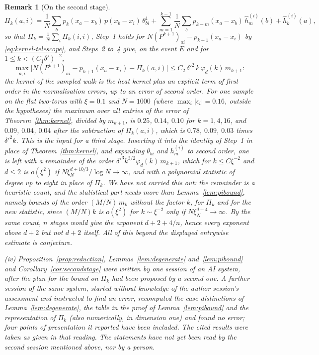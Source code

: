 \documentclass[11pt,a4paper]{article}
\theoremstyle{stmt}
\theoremstyle{defn}
\theoremstyle{rmk}
\newtheorem{remark}[theorem]{Remark}
\numberwithin{equation}{section}
\begin{document}
{\begin{remark}[On the second stage]
\[
\Pi_k(a,i)=\frac1N\sum_bp_k(x_a-x_b)\,p(x_b-x_i)\,\theta^1_{bi}+\sum_{m=1}^{k-1}\frac1N\sum_bp_{k-m}(x_a-x_b)\,\hat h^{(i)}_m(b)+\hat h^{(i)}_k(a),
\]
so that $\Pi_k=\frac1N\sum_i\Pi_k(i,i)$, Step~1 holds for $N(P^{k+1})_{ai}-p_{k+1}(x_a-x_i)$ by \eqref{eq:kernel-telescope}, and Steps~2 to~4 give, on the event $E$ and for $1\le k<(C_1\delta')^{-2}$,
\[
\max_{a,i}\big|N(P^{k+1})_{ai}-p_{k+1}(x_a-x_i)-\Pi_k(a,i)\big|\le C_2\,\delta'^2\,k\,\varphi_d(k)\,m_{k+1}:
\]
the kernel of the sampled walk is the heat kernel plus an explicit term of first order in the normalisation errors, up to an error of second order. For one sample on the flat two-torus with $\xi=0.1$ and $N=1000$ (where $\max_i|\epsilon_i|=0.16$, outside the hypotheses) the maximum over all entries of the error of Theorem~\ref{thm:kernel}, divided by $m_{k+1}$, is $0.25$, $0.14$, $0.10$ for $k=1,4,16$, and $0.09$, $0.04$, $0.04$ after the subtraction of $\Pi_k(a,i)$, which is $0.78$, $0.09$, $0.03$ times $\delta'^2k$. This is the input for a third stage. Inserting it into the identity of Step~1 in place of Theorem~\ref{thm:kernel}, and expanding $\theta_{bi}$ and $h^{(i)}_m$ to second order, one is left with a remainder of the order $\delta'^3k^{3/2}\varphi_d(k)\,m_{k+1}$, which for $k\le C\xi^{-2}$ and $d\le2$ is $o(\xi^2)$ if $N\xi_N^{d+10/3}/\log N\to\infty$, and with a polynomial statistic of degree up to eight in place of $\Pi_k$. We have not carried this out: the remainder is a heuristic count, and the statistical part needs more than Lemma~\ref{lem:pibound}, namely bounds of the order $(M/N)\,m_k$ \emph{without} the factor $k$, for $\Pi_k$ and for the new statistic, since $(M/N)k$ is $o(\xi^2)$ for $k\sim\xi^{-2}$ only if $N\xi_N^{d+4}\to\infty$. By the same count, $n$ stages would give the exponent $d+2+4/n$, hence every exponent above $d+2$ but not $d+2$ itself. All of this beyond the displayed entrywise estimate is conjecture.

(iv) Proposition~\ref{prop:reduction}, Lemmas~\ref{lem:degenerate} and~\ref{lem:pibound} and Corollary~\ref{cor:secondstage} were written by one session of an AI system, after the plan for the bound on $\Pi_k$ had been proposed by a second one. A further session of the same system, started without knowledge of the author session's assessment and instructed to find an error, recomputed the case distinctions of Lemma~\ref{lem:degenerate}, the table in the proof of Lemma~\ref{lem:pibound} and the representation of $\Pi_k$ (also numerically, in dimension one) and found no error; four points of presentation it reported have been included. The cited results were taken as given in that reading. The statements have not yet been read by the second session mentioned above, nor by a person.
\end{remark}

}
\end{document}
